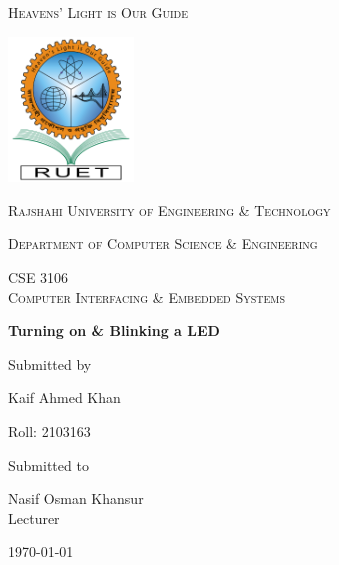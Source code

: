 \documentclass[12pt,a4paper]{article}
\newcommand{\univ}{Rajshahi University of Engineering \& Technology}
\newcommand{\thedept}{Department of Computer Science \& Engineering}
\newcommand{\thecourse}{CSE 3106 \\Computer Interfacing \& Embedded Systems}
\newcommand{\labgraph}{Turning on \& Blinking a LED}
\newcommand{\thetitle}{\labgraph}
\newcommand{\theauthor}{Kaif Ahmed Khan}
\newcommand{\thesupervisor}{Nasif Osman Khansur}
\newcommand{\lec}{Lecturer}
\newcommand{\thedesignation}{\lec}
\begin{document}
\begin{titlepage}
\centering
{\scshape Heavens' Light is Our Guide\par}\vspace{.25cm}
\includegraphics[width=0.25\textwidth]{logo}\par\vspace{1cm}
{\scshape\LARGE \univ\par}
\vspace{.5cm}
{\scshape\Large \thedept\par}
\vspace{1cm}
{\scshape\Large \thecourse\par}
\vspace{1cm}
{\huge\bfseries \thetitle\par}
\vspace{1cm}
Submitted by\par
{\Large \theauthor\par}
{\Large Roll: 2103163\par}
\vfill
Submitted to\par
{\Large \thesupervisor\\\thedesignation\par}
\vfill
{\large \today\par}
\end{titlepage}
\tableofcontents
\listoflistings
\listoffigures
\newpage

% 
% 

\end{document}
